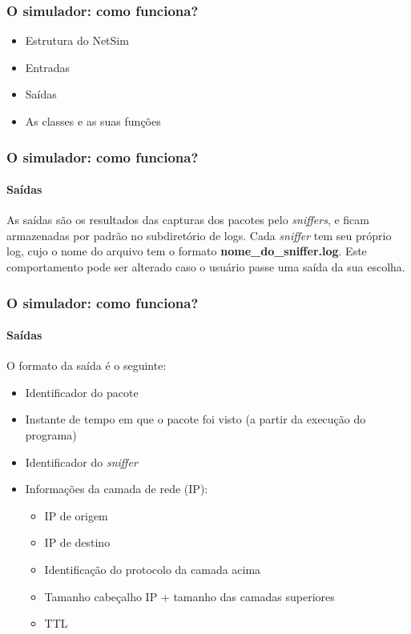 \documentclass{beamer}
\begin{document}
\begin{frame}
	\frametitle{O simulador: como funciona?}
	\begin{itemize}
		\item \textcolor{covered}{Estrutura do NetSim}
		\item \textcolor{covered}{Entradas}
		\item Saídas
		\item As classes e as suas funções
	\end{itemize}
\end{frame}

\begin{frame}
	\frametitle{O simulador: como funciona?}
	\framesubtitle{Saídas}
	As saídas são os resultados das capturas dos pacotes pelo \textit{sniffers}, e ficam armazenadas por padrão no subdiretório de logs. Cada \textit{sniffer} tem seu próprio log, cujo o nome do arquivo tem o formato
	\textbf{nome\_do\_sniffer.log}. Este comportamento pode ser alterado caso o usuário passe uma saída da sua escolha. 
\end{frame}

\begin{frame}
	\frametitle{O simulador: como funciona?}
	\framesubtitle{Saídas}
	O formato da saída é o seguinte:
	\begin{itemize}
		\item Identificador do pacote
		\item Instante de tempo em que o pacote foi visto (a partir da execução do programa)
		\item Identificador do \textit{sniffer}
		\item Informações da camada de rede (IP):
		\begin{itemize}
			\item IP de origem
			\item IP de destino
			\item Identificação do protocolo da camada acima
			\item Tamanho cabeçalho IP + tamanho das camadas superiores
			\item TTL
		\end{itemize}
	\end{itemize}
\end{frame}
\end{document}
